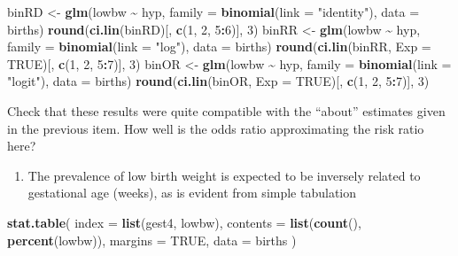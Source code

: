 \documentclass[
]{book}
\newenvironment{Shaded}{\begin{snugshade}}{\end{snugshade}}
\newcommand{\AttributeTok}[1]{\textcolor[rgb]{0.13,0.29,0.53}{#1}}
\newcommand{\ConstantTok}[1]{\textcolor[rgb]{0.56,0.35,0.01}{#1}}
\newcommand{\DecValTok}[1]{\textcolor[rgb]{0.00,0.00,0.81}{#1}}
\newcommand{\FunctionTok}[1]{\textcolor[rgb]{0.13,0.29,0.53}{\textbf{#1}}}
\newcommand{\NormalTok}[1]{#1}
\newcommand{\OtherTok}[1]{\textcolor[rgb]{0.56,0.35,0.01}{#1}}
\newcommand{\SpecialCharTok}[1]{\textcolor[rgb]{0.81,0.36,0.00}{\textbf{#1}}}
\newcommand{\StringTok}[1]{\textcolor[rgb]{0.31,0.60,0.02}{#1}}
\providecommand{\tightlist}{%
  \setlength{\itemsep}{0pt}\setlength{\parskip}{0pt}}
\begin{document}
\begin{Shaded}
\begin{Highlighting}[]
\NormalTok{binRD }\OtherTok{\textless{}{-}} \FunctionTok{glm}\NormalTok{(lowbw }\SpecialCharTok{\textasciitilde{}}\NormalTok{ hyp, }\AttributeTok{family =} \FunctionTok{binomial}\NormalTok{(}\AttributeTok{link =} \StringTok{"identity"}\NormalTok{), }\AttributeTok{data =}\NormalTok{ births)}
\FunctionTok{round}\NormalTok{(}\FunctionTok{ci.lin}\NormalTok{(binRD)[, }\FunctionTok{c}\NormalTok{(}\DecValTok{1}\NormalTok{, }\DecValTok{2}\NormalTok{, }\DecValTok{5}\SpecialCharTok{:}\DecValTok{6}\NormalTok{)], }\DecValTok{3}\NormalTok{)}
\NormalTok{binRR }\OtherTok{\textless{}{-}} \FunctionTok{glm}\NormalTok{(lowbw }\SpecialCharTok{\textasciitilde{}}\NormalTok{ hyp, }\AttributeTok{family =} \FunctionTok{binomial}\NormalTok{(}\AttributeTok{link =} \StringTok{"log"}\NormalTok{), }\AttributeTok{data =}\NormalTok{ births)}
\FunctionTok{round}\NormalTok{(}\FunctionTok{ci.lin}\NormalTok{(binRR, }\AttributeTok{Exp =} \ConstantTok{TRUE}\NormalTok{)[, }\FunctionTok{c}\NormalTok{(}\DecValTok{1}\NormalTok{, }\DecValTok{2}\NormalTok{, }\DecValTok{5}\SpecialCharTok{:}\DecValTok{7}\NormalTok{)], }\DecValTok{3}\NormalTok{)}
\NormalTok{binOR }\OtherTok{\textless{}{-}} \FunctionTok{glm}\NormalTok{(lowbw }\SpecialCharTok{\textasciitilde{}}\NormalTok{ hyp, }\AttributeTok{family =} \FunctionTok{binomial}\NormalTok{(}\AttributeTok{link =} \StringTok{"logit"}\NormalTok{), }\AttributeTok{data =}\NormalTok{ births)}
\FunctionTok{round}\NormalTok{(}\FunctionTok{ci.lin}\NormalTok{(binOR, }\AttributeTok{Exp =} \ConstantTok{TRUE}\NormalTok{)[, }\FunctionTok{c}\NormalTok{(}\DecValTok{1}\NormalTok{, }\DecValTok{2}\NormalTok{, }\DecValTok{5}\SpecialCharTok{:}\DecValTok{7}\NormalTok{)], }\DecValTok{3}\NormalTok{)}
\end{Highlighting}
\end{Shaded}

Check that these results were quite compatible with the
``about'' estimates given in the previous item.
How well is the odds ratio approximating the risk ratio here?

\begin{enumerate}
\def\labelenumi{\arabic{enumi}.}
\setcounter{enumi}{2}
\tightlist
\item
  The prevalence of low birth weight is expected to be inversely related
  to gestational age (weeks), as is evident from simple tabulation
\end{enumerate}

\begin{Shaded}
\begin{Highlighting}[]
\FunctionTok{stat.table}\NormalTok{(}
  \AttributeTok{index =} \FunctionTok{list}\NormalTok{(gest4, lowbw),}
  \AttributeTok{contents =} \FunctionTok{list}\NormalTok{(}\FunctionTok{count}\NormalTok{(), }\FunctionTok{percent}\NormalTok{(lowbw)),}
  \AttributeTok{margins =} \ConstantTok{TRUE}\NormalTok{, }\AttributeTok{data =}\NormalTok{ births}
\NormalTok{)}
\end{Highlighting}
\end{Shaded}
\end{document}
